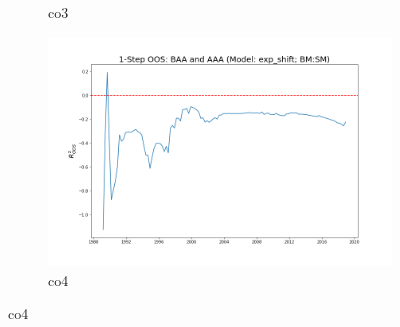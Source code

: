 \documentclass[a4paper,12pt,times,numbered,print,index]{report}
\numberwithin{equation}{section}
\begin{document}
\begin{figure}[!htbp]
\begin{subfigure}[b]{0.42\linewidth}
			\caption{co3}
		\end{subfigure}
		\begin{subfigure}[b]{0.42\linewidth}
			\includegraphics[width=0.9\linewidth]{OOS_plots/exp_shift_co4_SM.png}
			\caption{co4}
		\end{subfigure}
		\label{g5}
	\end{figure}
	
\end{document}
